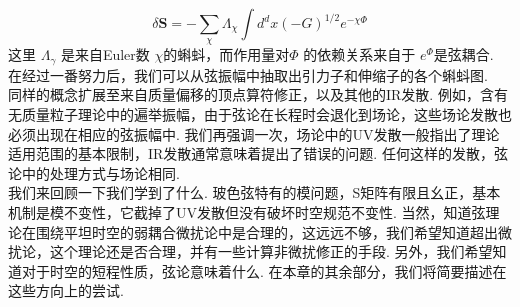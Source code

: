\begin{equation}
	\delta \boldsymbol{S}=-\sum_{\chi} \Lambda_{\chi} \int d^{d} x(-G)^{1 / 2} e^{-\chi \Phi}
\end{equation}
这里 $\Lambda_{\gamma}$ 是来自Euler数 $\chi$的蝌蚪，而作用量对$\Phi$ 的依赖关系来自于 $e^{\Phi}$是弦耦合. 在经过一番努力后，我们可以从弦振幅中抽取出引力子和伸缩子的各个蝌蚪图.\\
同样的概念扩展至来自质量偏移的顶点算符修正，以及其他的IR发散. 例如，含有无质量粒子理论中的遍举振幅，由于弦论在长程时会退化到场论，这些场论发散也必须出现在相应的弦振幅中. 我们再强调一次，场论中的UV发散一般指出了理论适用范围的基本限制，IR发散通常意味着提出了错误的问题. 任何这样的发散，弦论中的处理方式与场论相同.\\
我们来回顾一下我们学到了什么. 玻色弦特有的模问题，S矩阵有限且幺正，基本机制是模不变性，它截掉了UV发散但没有破坏时空规范不变性. 当然，知道弦理论在围绕平坦时空的弱耦合微扰论中是合理的，这远远不够，我们希望知道超出微扰论，这个理论还是否合理，并有一些计算非微扰修正的手段. 另外，我们希望知道对于时空的短程性质，弦论意味着什么. 在本章的其余部分，我们将简要描述在这些方向上的尝试.

